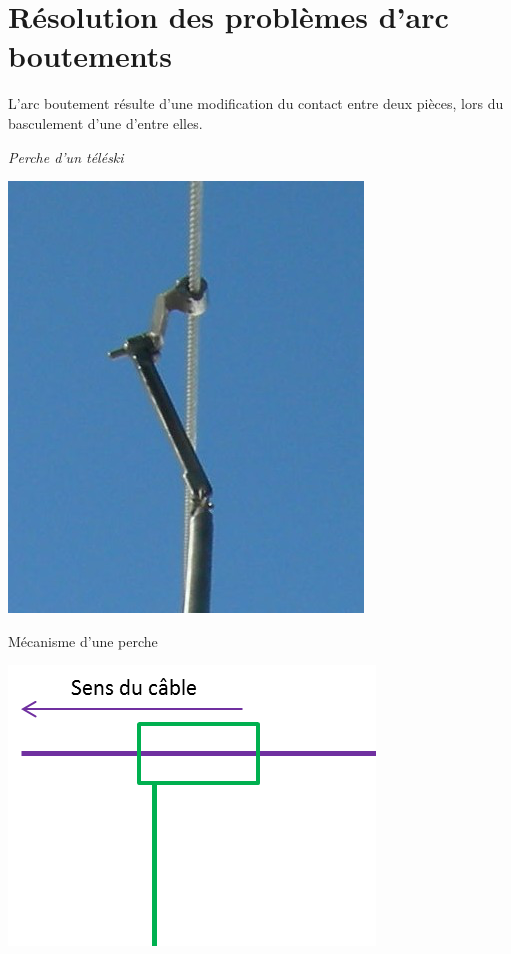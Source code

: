 \documentclass[10pt]{article}
\begin{document}
\section{Résolution des problèmes d'arc boutements}
L'arc boutement résulte d'une modification du contact entre deux pièces, lors du basculement d'une d'entre elles. 
\begin{exemple}
\textit{Perche d'un téléski}

\begin{center}
\begin{minipage}[c]{.3\linewidth}
\begin{center}
\includegraphics[width=.9\textwidth]{images/perche}

Mécanisme d'une perche
\end{center}
\end{minipage}\hfill
\begin{minipage}[c]{.3\linewidth}
\begin{center}
\includegraphics[width=.9\textwidth]{images/arc1}


\end{center}
\end{minipage}
\end{center}
\end{exemple}
\end{document}
